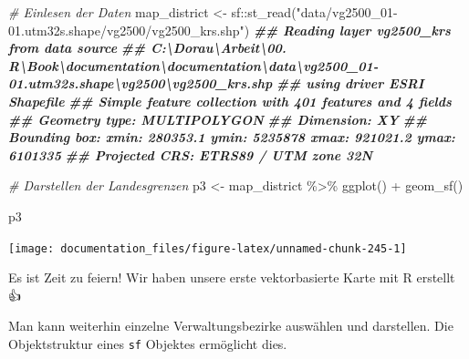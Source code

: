 \documentclass[
]{article}
\newenvironment{Shaded}{\begin{snugshade}}{\end{snugshade}}
\newcommand{\CommentTok}[1]{\textcolor[rgb]{0.56,0.35,0.01}{\textit{#1}}}
\newcommand{\DocumentationTok}[1]{\textcolor[rgb]{0.56,0.35,0.01}{\textbf{\textit{#1}}}}
\newcommand{\FunctionTok}[1]{\textcolor[rgb]{0.00,0.00,0.00}{#1}}
\newcommand{\NormalTok}[1]{#1}
\newcommand{\OtherTok}[1]{\textcolor[rgb]{0.56,0.35,0.01}{#1}}
\newcommand{\SpecialCharTok}[1]{\textcolor[rgb]{0.00,0.00,0.00}{#1}}
\newcommand{\StringTok}[1]{\textcolor[rgb]{0.31,0.60,0.02}{#1}}
\begin{document}
\begin{Shaded}
\begin{Highlighting}[]

\CommentTok{\# Einlesen der Daten}
\NormalTok{map\_district }\OtherTok{\textless{}{-}}\NormalTok{ sf}\SpecialCharTok{::}\FunctionTok{st\_read}\NormalTok{(}\StringTok{"data/vg2500\_01{-}01.utm32s.shape/vg2500/vg2500\_krs.shp"}\NormalTok{)}
\DocumentationTok{\#\# Reading layer \textasciigrave{}vg2500\_krs\textquotesingle{} from data source }
\DocumentationTok{\#\#   \textasciigrave{}C:\textbackslash{}Dorau\textbackslash{}Arbeit\textbackslash{}00. R\textbackslash{}Book\textbackslash{}documentation\textbackslash{}documentation\textbackslash{}data\textbackslash{}vg2500\_01{-}01.utm32s.shape\textbackslash{}vg2500\textbackslash{}vg2500\_krs.shp\textquotesingle{} }
\DocumentationTok{\#\#   using driver \textasciigrave{}ESRI Shapefile\textquotesingle{}}
\DocumentationTok{\#\# Simple feature collection with 401 features and 4 fields}
\DocumentationTok{\#\# Geometry type: MULTIPOLYGON}
\DocumentationTok{\#\# Dimension:     XY}
\DocumentationTok{\#\# Bounding box:  xmin: 280353.1 ymin: 5235878 xmax: 921021.2 ymax: 6101335}
\DocumentationTok{\#\# Projected CRS: ETRS89 / UTM zone 32N}

\CommentTok{\# Darstellen der Landesgrenzen}
\NormalTok{p3 }\OtherTok{\textless{}{-}}\NormalTok{ map\_district }\SpecialCharTok{\%\textgreater{}\%}
  \FunctionTok{ggplot}\NormalTok{() }\SpecialCharTok{+} 
  \FunctionTok{geom\_sf}\NormalTok{()}

\NormalTok{p3}
\end{Highlighting}
\end{Shaded}

\begin{center}\texttt{[image: documentation\_files/figure-latex/unnamed-chunk-245-1]} \end{center}

Es ist Zeit zu feiern! Wir haben unsere erste vektorbasierte Karte mit R erstellt 👍

Man kann weiterhin einzelne Verwaltungsbezirke auswählen und darstellen. Die Objektstruktur eines \texttt{sf} Objektes ermöglicht dies.
\end{document}
